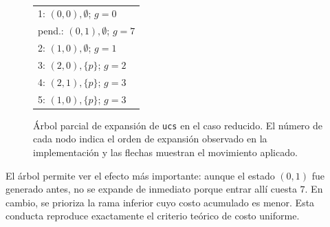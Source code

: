 \documentclass[12pt,a4paper]{article}
\newcommand{\treeopdraw}[5]{%
    \draw[movearrow] ($ (#1)!#3!(#2) + #4 $) -- ($ (#1)!#3!(#2) + #5 $);
}
\begin{document}
\begin{figure}[H]
    \centering
    \begin{minipage}{0.38\textwidth}
        \centering
        \\[0.05cm]
        {\scriptsize
        \begin{tabular}{@{}l@{}}
        1: $(0,0),\emptyset$; $g=0$ \\
        pend.: $(0,1),\emptyset$; $g=7$ \\
        2: $(1,0),\emptyset$; $g=1$ \\
        3: $(2,0),\{p\}$; $g=2$ \\
        4: $(2,1),\{p\}$; $g=3$ \\
        5: $(1,0),\{p\}$; $g=3$
        \end{tabular}}
    \end{minipage}
    \caption{Árbol parcial de expansión de \texttt{ucs} en el caso reducido. El número de cada nodo indica el orden de expansión observado en la implementación y las flechas muestran el movimiento aplicado.}
    \label{fig:ucs-reducido}
\end{figure}

El árbol permite ver el efecto más importante: aunque el estado \((0,1)\) fue generado antes, no se expande de inmediato porque entrar allí cuesta \(7\). En cambio, se prioriza la rama inferior cuyo costo acumulado es menor. Esta conducta reproduce exactamente el criterio teórico de costo uniforme.
\end{document}

